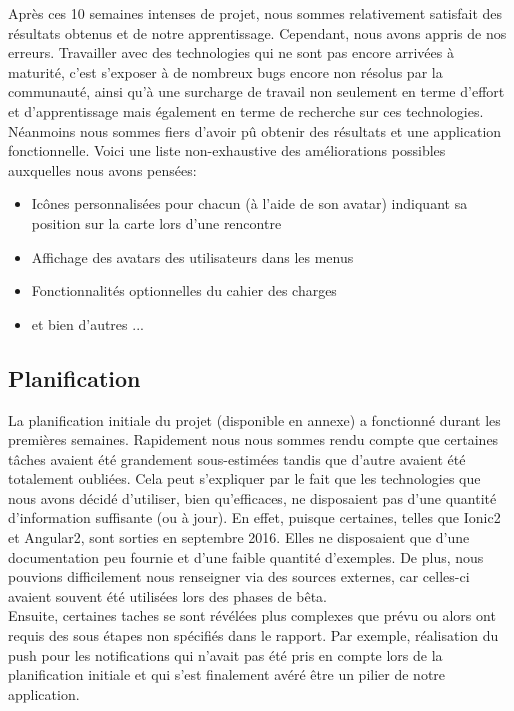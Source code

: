 \documentclass[french]{article}
\begin{document}
		
		Après ces 10 semaines intenses de projet, nous sommes relativement satisfait des résultats obtenus et de notre apprentissage. Cependant, nous avons appris de nos erreurs. Travailler avec des technologies qui ne sont pas encore arrivées à maturité, c'est s'exposer à de nombreux bugs encore non résolus par la communauté, ainsi qu'à une surcharge de travail non seulement en terme d'effort et d'apprentissage mais également en terme de recherche sur ces technologies. Néanmoins nous sommes fiers d'avoir pû obtenir des résultats et une application fonctionnelle. Voici une liste non-exhaustive des améliorations possibles auxquelles nous avons pensées:
		\begin{itemize}
			\item Icônes personnalisées pour chacun (à l'aide de son avatar) indiquant sa position sur la carte lors d'une rencontre
			\item Affichage des avatars des utilisateurs dans les menus
			\item Fonctionnalités optionnelles du cahier des charges
			\item et bien d'autres ...
		\end{itemize}
		
		\subsection{Planification}
		
		La planification initiale du projet (disponible en annexe) a fonctionné durant les premières semaines. Rapidement nous nous sommes rendu compte que certaines tâches avaient été grandement sous-estimées tandis que d'autre avaient été totalement oubliées.
		Cela peut s'expliquer par le fait que les technologies que nous avons décidé d'utiliser, bien qu'efficaces, ne disposaient pas d'une quantité d'information suffisante (ou à jour). En effet, puisque certaines, telles que Ionic2 et Angular2, sont sorties en septembre 2016. Elles ne disposaient que d'une documentation peu fournie et d'une faible quantité d'exemples. De plus, nous pouvions difficilement nous renseigner via des sources externes, car celles-ci avaient souvent été utilisées lors des phases de bêta. \\ 
		
		Ensuite, certaines taches se sont révélées plus complexes que prévu ou alors ont requis des sous étapes non spécifiés dans le rapport. Par exemple, réalisation du push pour les notifications qui n'avait pas été pris en compte lors de la planification initiale et qui s'est finalement avéré être un pilier de notre application.
		
\end{document}
